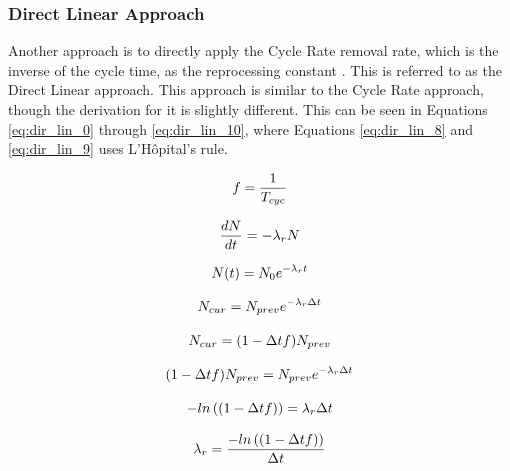 \subsubsection{Direct Linear Approach}

Another approach is to directly apply the Cycle Rate removal rate, which is the inverse of the cycle time, as the reprocessing constant \cite{hombourger_eql0d_2020}. This is referred to as the Direct Linear approach. This approach is similar to the Cycle Rate approach, though the derivation for it is slightly different. This can be seen in Equations \eqref{eq:dir_lin_0} through \eqref{eq:dir_lin_10}, where Equations \eqref{eq:dir_lin_8} and \eqref{eq:dir_lin_9} uses L'Hôpital's rule.

\begin{equation} \hfill
f = \frac{1}{T_{cyc}}
\hfill\label{eq:dir_lin_0} \end{equation}

\begin{equation} \hfill
\frac{dN}{dt} = -\lambda_r N
\hfill\label{eq:dir_lin_1} \end{equation}

\begin{equation} \hfill
N(t) = N_0 e^{-\lambda_r t}
\hfill\label{eq:dir_lin_1_2} \end{equation}

\begin{equation} \hfill
N_{cur} = N_{prev} e^{-\lambda_r \Delta t}
\hfill\label{eq:dir_lin_2} \end{equation}

\begin{equation} \hfill
N_{cur} = (1 - \Delta t f) N_{prev}
\hfill\label{eq:dir_lin_3} \end{equation}

\begin{equation} \hfill
(1 - \Delta t f) N_{prev} = N_{prev} e^{-\lambda_r \Delta t}
\hfill\label{eq:dir_lin_4} \end{equation}

\begin{equation} \hfill
-ln\left((1 - \Delta t f)\right) = \lambda_r \Delta t
\hfill\label{eq:dir_lin_5} \end{equation}

\begin{equation} \hfill
\lambda_r = \frac{-ln\left((1 - \Delta t f)\right)}{\Delta t}
\hfill\label{eq:dir_lin_6} \end{equation}

